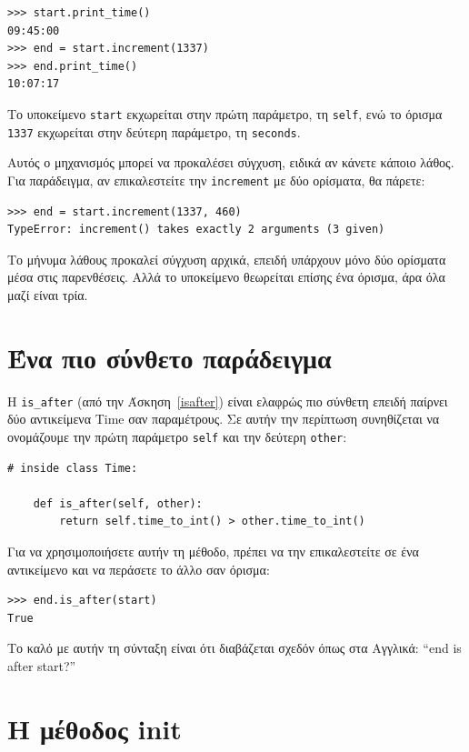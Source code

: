 \documentclass[10pt]{book}
\begin{document}
\begin{verbatim}
>>> start.print_time()
09:45:00
>>> end = start.increment(1337)
>>> end.print_time()
10:07:17
\end{verbatim}
%
Το υποκείμενο {\tt start} εκχωρείται στην πρώτη παράμετρο, τη {\tt self}, ενώ το όρισμα {\tt 1337} εκχωρείται
στην δεύτερη παράμετρο, τη {\tt seconds}.

Αυτός ο μηχανισμός μπορεί να προκαλέσει σύγχυση, ειδικά αν κάνετε κάποιο λάθος. 
Για παράδειγμα, αν επικαλεστείτε την {\tt increment} με δύο ορίσματα, θα πάρετε:

\begin{verbatim}
>>> end = start.increment(1337, 460)
TypeError: increment() takes exactly 2 arguments (3 given)
\end{verbatim}
%
Το μήνυμα λάθους προκαλεί σύγχυση αρχικά, επειδή υπάρχουν μόνο δύο ορίσματα μέσα στις παρενθέσεις.
Αλλά το υποκείμενο θεωρείται επίσης ένα όρισμα, άρα όλα μαζί είναι τρία.


\section{Ένα πιο σύνθετο παράδειγμα}

Η \verb"is_after" (από την Άσκηση~\ref{isafter}) είναι ελαφρώς πιο σύνθετη επειδή παίρνει δύο αντικείμενα
Time σαν παραμέτρους. Σε αυτήν την περίπτωση συνηθίζεται να ονομάζουμε την πρώτη παράμετρο {\tt self} και
την δεύτερη {\tt other}:

\begin{verbatim}
# inside class Time:

    def is_after(self, other):
        return self.time_to_int() > other.time_to_int()
\end{verbatim}
%
Για να χρησιμοποιήσετε αυτήν τη μέθοδο, πρέπει να την επικαλεστείτε σε ένα αντικείμενο και να περάσετε το άλλο
σαν όρισμα:

\begin{verbatim}
>>> end.is_after(start)
True
\end{verbatim}
%
Το καλό με αυτήν τη σύνταξη είναι ότι διαβάζεται σχεδόν όπως στα Αγγλικά:
``end is after start?''



\section{Η μέθοδος {init}}
\end{document}
